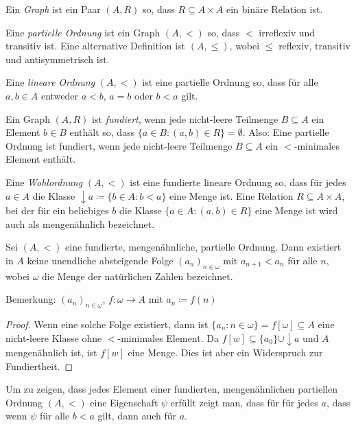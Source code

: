 Ein \textit{Graph} ist ein Paar $(A, R)$ so, dass $R\subseteq A\times A$ ein binäre Relation ist.

\begin{definition}
	Eine \textit{partielle Ordnung} ist ein Graph $(A,<)$ so, dass $<$ irreflexiv und transitiv ist. Eine alternative Definition ist $(A,\leq)$, wobei $\leq$ reflexiv, transitiv und antisymmetrisch ist.
\end{definition}

Eine \textit{lineare Ordnung} $(A,<)$ ist eine partielle Ordnung so, dass für alle $a,b\in A$ entweder $a<b$, $a=b$ oder $b<a$ gilt.

Ein Graph $(A,R)$ ist \textit{fundiert}, wenn jede nicht-leere Teilmenge $B\subseteq A$ ein Element $b\in B$ enthält so, dass $\{a\in B : (a,b) \in R\}= \emptyset$.
Also: Eine partielle Ordnung ist fundiert, wenn jede nicht-leere Teilmenge $B\subseteq A$ ein $<$-minimales Element enthält.

\begin{definition}[Wohlordnungen]
	Eine \textit{Wohlordnung} $(A,<)$ ist eine fundierte lineare Ordnung so, dass für jedes $a\in A$ die Klasse $\downarrow a\coloneqq \{b\in A : b < a\}$ eine Menge ist.
	Eine Relation $R\subseteq A\times A$, bei der für ein beliebiges $b$ die Klasse $\{a\in A : (a,b)\in R\}$ eine Menge ist wird auch als mengenähnlich bezeichnet.
\end{definition}

\begin{lemma}
	Sei $(A,<)$ eine fundierte, mengenähnliche, partielle Ordnung. Dann existiert in $A$ keine unendliche absteigende Folge $(a_n)_{n\in \omega}$ mit $a_{n+1}<a_n$ für alle $n$, wobei $\omega$ die Menge der natürlichen Zahlen bezeichnet.
\end{lemma}

Bemerkung: $(a_n)_{n\in \omega}$, $f:\omega \to A$ mit $a_n\coloneqq f(n)$

\begin{proof}
	Wenn eine solche Folge existiert, dann ist $\{a_n : n\in \omega\}=f[\omega]\subseteq A$ eine nicht-leere Klasse ohne $<$-minimales Element. Da $f[w]\subseteq \{a_0\}\cup \downarrow a$ und $A$ mengenähnlich ist, ist $f[w]$ eine Menge. Dies ist aber ein Widerspruch zur Fundiertheit.
\end{proof}

Um zu zeigen, dass jedes Element einer fundierten, mengenähnlichen partiellen Ordnung $(A,<)$ eine Eigenschaft $\psi$ erfüllt zeigt man, dass für für jedes $a$, dass wenn $\psi$ für alle $b<a$ gilt, dann auch für $a$.

